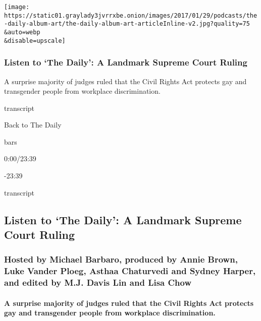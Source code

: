 \texttt{[image: https://static01.graylady3jvrrxbe.onion/images/2017/01/29/podcasts/the-daily-album-art/the-daily-album-art-articleInline-v2.jpg?quality=75\\\&auto=webp\\\&disable=upscale]}

\hypertarget{listen-to-the-daily-a-landmark-supreme-court-ruling}{%
\subsubsection{Listen to `The Daily': A Landmark Supreme Court
Ruling}\label{listen-to-the-daily-a-landmark-supreme-court-ruling}}

A surprise majority of judges ruled that the Civil Rights Act protects
gay and transgender people from workplace discrimination.

transcript

Back to The Daily

bars

0:00/23:39

-23:39

transcript

\hypertarget{listen-to-the-daily-a-landmark-supreme-court-ruling-1}{%
\subsection{Listen to `The Daily': A Landmark Supreme Court
Ruling}\label{listen-to-the-daily-a-landmark-supreme-court-ruling-1}}

\hypertarget{hosted-by-michael-barbaro-produced-by-annie-brown-luke-vander-ploeg-asthaa-chaturvedi-and-sydney-harper-and-edited-by-mj-davis-lin-and-lisa-chow}{%
\subsubsection{Hosted by Michael Barbaro, produced by Annie Brown, Luke
Vander Ploeg, Asthaa Chaturvedi and Sydney Harper, and edited by M.J.
Davis Lin and Lisa
Chow}\label{hosted-by-michael-barbaro-produced-by-annie-brown-luke-vander-ploeg-asthaa-chaturvedi-and-sydney-harper-and-edited-by-mj-davis-lin-and-lisa-chow}}

\hypertarget{a-surprise-majority-of-judges-ruled-that-the-civil-rights-act-protects-gay-and-transgender-people-from-workplace-discrimination}{%
\paragraph{A surprise majority of judges ruled that the Civil Rights Act
protects gay and transgender people from workplace
discrimination.}\label{a-surprise-majority-of-judges-ruled-that-the-civil-rights-act-protects-gay-and-transgender-people-from-workplace-discrimination}}

